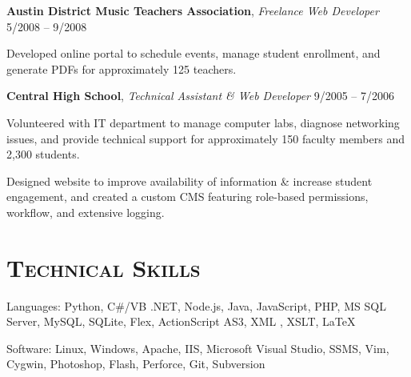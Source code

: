 \documentclass[12pt,a4paper]{article}
\newcommand{\sectionhead}{\normalfont\normalsize\scshape}
\newcommand{\workhead}[3]{\textbf{#1}, \emph{#2} \hfill #3}
\newcommand{\li}{\item[--]}
\begin{document}
\begin{description}[leftmargin=0em]
    \item
        \workhead{Austin District Music Teachers Association}{Freelance Web Developer}{5/2008 -- 9/2008}
        \begin{itemize*}
            \li Developed online portal to schedule events, manage student enrollment, and generate PDFs for approximately 125 teachers.
        \end{itemize*}


    \item
        \workhead{Central High School}{Technical Assistant \& Web Developer}{9/2005 -- 7/2006}
        \begin{itemize*}
            \li Volunteered with IT department to manage computer labs, diagnose networking issues, and provide technical support for approximately 150 faculty members and 2,300 
students.
            \li Designed website to improve availability of information \& increase student engagement, and created a custom CMS featuring role-based permissions, workflow, and extensive logging.
        \end{itemize*}
\end{description}

\section*{\sectionhead Technical Skills}
\begin{description}
    \itemsep0pt
    \parskip5pt
    \item Languages: Python, C\#/VB .NET, Node.js, Java, JavaScript, PHP, MS SQL Server, MySQL, SQLite, Flex, ActionScript AS3, XML \Smiley, XSLT, \LaTeX
    \item Software: Linux, Windows, Apache, IIS, Microsoft Visual Studio, SSMS, Vim, Cygwin, Photoshop, Flash, Perforce, Git, Subversion
\end{description}
\end{document}
